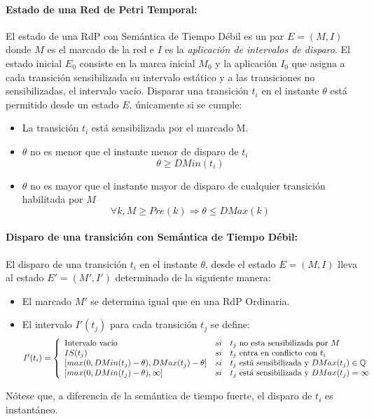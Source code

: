 \paragraph{Estado de una Red de Petri Temporal:}

El estado de una RdP con Semántica de Tiempo Débil es un par $E = (M, I)$ donde
$M$ es el marcado de la red e $I$ es la \textit{aplicación de intervalos de
disparo}. El estado inicial $E_{0}$ consiste en la marca inicial $M_{0}$ y la
aplicación $I_{0}$ que asigna a cada transición sensibilizada su intervalo
estático y a las transiciones no sensibilizadas, el intervalo vacío.
Disparar una transición $t_{i}$ en el instante $\theta$ está permitido desde un
estado $E$, únicamente si se cumple:
\begin{itemize}
  \item La transición $t_{i}$ está sensibilizada por el marcado M.
  \item $\theta$ no es menor que el instante menor de disparo de $t_{i}$
  $$\theta \geq DMin(t_{i})$$
  \item $\theta$ no es mayor que el instante mayor de disparo de cualquier
  transición habilitada por $M$
  $$ \forall k, M \geq Pre(k) \Rightarrow \theta \leq DMax(k) $$
\end{itemize}

\paragraph{Disparo de una transición con Semántica de Tiempo Débil:}

El disparo de una transición $t_{i}$ en el instante $\theta$, desde el estado
$E = (M,I)$ lleva al estado $E' = (M', I')$ determinado de la siguiente manera:
\begin{itemize}
  \item El marcado $M'$ se determina igual que en una RdP Ordinaria.
  \item El intervalo $I'(t_{j})$ para cada transición $t_{j}$ se define:
  $$ I'(t_{i}) = \left\{
  \begin{array}{lll}
    \textnormal{Intervalo vacío} & si & t_{j} \textnormal{ no esta sensibilizada
    por } M \\
    IS(t_{j}) & si & t_{j} \textnormal{ entra en conflicto con } t_{i} \\
    \lbrack max(0, DMin(t_{j}) - \theta), DMax(t_{j}) - \theta \rbrack & si &
    t_{j} \textnormal{ está sensibilizada y } DMax(t_{j}) \in \mathbb{Q} \\
    \lbrack max(0, DMin(t_{j}) - \theta), \infty \rbrack & si & t_{j}
    \textnormal{ está sensibilizada y } DMax(t_{j}) = \infty \\
  \end{array}
\right.$$
\end{itemize}
Nótese que, a diferencia de la semántica de tiempo fuerte, el disparo de $t_{i}$
es instantáneo.

